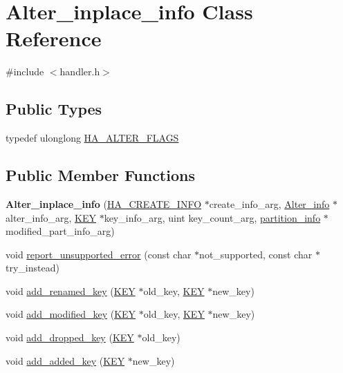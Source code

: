 \hypertarget{classAlter__inplace__info}{}\section{Alter\+\_\+inplace\+\_\+info Class Reference}
\label{classAlter__inplace__info}


{\ttfamily \#include $<$handler.\+h$>$}

\subsection*{Public Types}
\begin{DoxyCompactItemize}
\item 
typedef ulonglong \mbox{\hyperlink{classAlter__inplace__info_a45258f36b4942b5cabee7239463daaca}{H\+A\+\_\+\+A\+L\+T\+E\+R\+\_\+\+F\+L\+A\+GS}}
\end{DoxyCompactItemize}
\subsection*{Public Member Functions}
\begin{DoxyCompactItemize}
\item 
\mbox{\label{classAlter__inplace__info_a2bd6a2de6ddfc25a6db9b6fb9748c40c}} 
{\bfseries Alter\+\_\+inplace\+\_\+info} (\mbox{\hyperlink{structst__ha__create__information}{H\+A\+\_\+\+C\+R\+E\+A\+T\+E\+\_\+\+I\+N\+FO}} $\ast$create\+\_\+info\+\_\+arg, \mbox{\hyperlink{classAlter__info}{Alter\+\_\+info}} $\ast$alter\+\_\+info\+\_\+arg, \mbox{\hyperlink{structst__key}{K\+EY}} $\ast$key\+\_\+info\+\_\+arg, uint key\+\_\+count\+\_\+arg, \mbox{\hyperlink{classpartition__info}{partition\+\_\+info}} $\ast$modified\+\_\+part\+\_\+info\+\_\+arg)
\item 
void \mbox{\hyperlink{classAlter__inplace__info_a675fa8a5eedb1072620e3b831de6d946}{report\+\_\+unsupported\+\_\+error}} (const char $\ast$not\+\_\+supported, const char $\ast$try\+\_\+instead)
\item 
void \mbox{\hyperlink{classAlter__inplace__info_a7dfe0287b43d7e00273e9dc53e495b2b}{add\+\_\+renamed\+\_\+key}} (\mbox{\hyperlink{structst__key}{K\+EY}} $\ast$old\+\_\+key, \mbox{\hyperlink{structst__key}{K\+EY}} $\ast$new\+\_\+key)
\item 
void \mbox{\hyperlink{classAlter__inplace__info_ac7de4c704b1da1dfb94388e12b3f6336}{add\+\_\+modified\+\_\+key}} (\mbox{\hyperlink{structst__key}{K\+EY}} $\ast$old\+\_\+key, \mbox{\hyperlink{structst__key}{K\+EY}} $\ast$new\+\_\+key)
\item 
void \mbox{\hyperlink{classAlter__inplace__info_adbda99c1a72be418fd275cb1eea583c4}{add\+\_\+dropped\+\_\+key}} (\mbox{\hyperlink{structst__key}{K\+EY}} $\ast$old\+\_\+key)
\item 
void \mbox{\hyperlink{classAlter__inplace__info_abea1eb531573b17be5f6622b2c8c4405}{add\+\_\+added\+\_\+key}} (\mbox{\hyperlink{structst__key}{K\+EY}} $\ast$new\+\_\+key)
\end{DoxyCompactItemize}
